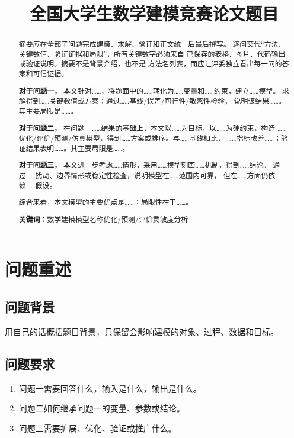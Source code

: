 \documentclass[12pt,a4paper]{ctexart}
\title{全国大学生数学建模竞赛论文题目}
\author{}
\date{}
\newcommand{\keywords}[1]{\par\noindent\textbf{关键词：}#1}
\begin{document}
\maketitle

\begin{abstract}
摘要应在全部子问题完成建模、求解、验证和正文统一后最后撰写。
逐问交代“方法、关键数值、验证证据和局限”，所有关键数字必须来自
已保存的表格、图片、代码输出或验证说明。摘要不是背景介绍，也不是
方法名列表，而应让评委独立看出每一问的答案和可信证据。

\textbf{对于问题一，}
本文针对……，将题面中的……转化为……变量和……约束，建立……模型。
求解得到……关键数值或方案；通过……基线/误差/可行性/敏感性检验，
说明该结果……。其主要局限是……。

\textbf{对于问题二，}
在问题一……结果的基础上，本文以……为目标，以……为硬约束，构造
……优化/评价/预测/仿真模型，得到……方案或排序。与……基线相比，
……指标改善……；验证结果表明……。其主要局限是……。

\textbf{对于问题三，}
本文进一步考虑……情形，采用……模型刻画……机制，得到……结论。
通过……扰动、边界情形或稳定性检查，说明模型在……范围内可靠，
但在……方面仍依赖……假设。

综合来看，本文模型的主要优点是……；局限性在于……。

\keywords{数学建模\quad 模型名称\quad 优化/预测/评价\quad 灵敏度分析}
\end{abstract}

\section{问题重述}

\subsection{问题背景}

用自己的话概括题目背景，只保留会影响建模的对象、过程、数据和目标。

\subsection{问题要求}

\begin{enumerate}
  \item 问题一需要回答什么，输入是什么，输出是什么。
  \item 问题二如何继承问题一的变量、参数或结论。
  \item 问题三需要扩展、优化、验证或推广什么。
\end{enumerate}
\end{document}
